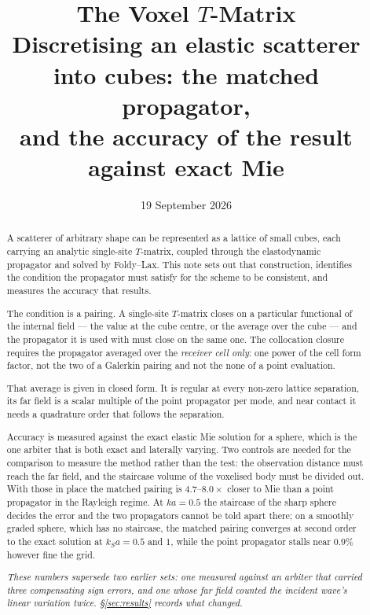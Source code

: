 \documentclass[11pt,a4paper]{article}
\title{\bfseries The Voxel \texorpdfstring{$T$}{T}-Matrix\\[4pt]
\large Discretising an elastic scatterer into cubes: the matched propagator,\\
and the accuracy of the result against exact Mie}
\author{}
\date{19 September 2026}
\begin{document}
\maketitle

\begin{abstract}
\noindent
A scatterer of arbitrary shape can be represented as a lattice of small cubes,
each carrying an analytic single-site $T$-matrix, coupled through the
elastodynamic propagator and solved by Foldy--Lax.  This note sets out that
construction, identifies the condition the propagator must satisfy for the
scheme to be consistent, and measures the accuracy that results.

The condition is a pairing.  A single-site $T$-matrix closes on a particular
functional of the internal field --- the value at the cube centre, or the
average over the cube --- and the propagator it is used with must close on the
same one.  The collocation closure requires the propagator averaged over the
\emph{receiver cell only}: one power of the cell form factor, not the two of a
Galerkin pairing and not the none of a point evaluation.

That average is given in closed form.  It is regular at every non-zero lattice
separation, its far field is a scalar multiple of the point propagator per
mode, and near contact it needs a quadrature order that follows the separation.

Accuracy is measured against the exact elastic Mie solution for a sphere, which
is the one arbiter that is both exact and laterally varying.  Two controls are
needed for the comparison to measure the method rather than the test: the
observation distance must reach the far field, and the staircase volume of the
voxelised body must be divided out.  With those in place the matched pairing is
$4.7$--$8.0\times$ closer to Mie than a point propagator in the Rayleigh
regime.  At $ka = 0.5$ the staircase of the sharp sphere decides the error and
the two propagators cannot be told apart there; on a smoothly graded sphere,
which has no staircase, the matched pairing converges at second order to the
exact solution at $k_Sa = 0.5$ and $1$, while the point propagator stalls near
$0.9\%$ however fine the grid.

\emph{These numbers supersede two earlier sets: one measured against an arbiter
that carried three compensating sign errors, and one whose far field counted
the incident wave's linear variation twice. \S\ref{sec:results} records what
changed.}
\end{abstract}
\end{document}
